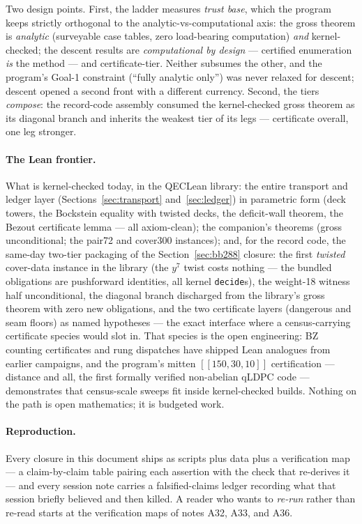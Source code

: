 \documentclass[11pt]{article}
\theoremstyle{plain}
\theoremstyle{definition}
\theoremstyle{remark}
\begin{document}
Two design points. First, the ladder measures \emph{trust base}, which
the program keeps strictly orthogonal to the analytic-vs-computational
axis: the gross theorem is \emph{analytic} (surveyable case tables,
zero load-bearing computation) \emph{and} kernel-checked; the descent
results are \emph{computational by design} --- certified enumeration
\emph{is} the method --- and certificate-tier. Neither subsumes the
other, and the program's Goal-1 constraint (``fully analytic only'') was
never relaxed for descent; descent opened a second front with a
different currency. Second, the tiers \emph{compose}: the record-code
assembly consumed the kernel-checked gross theorem as its diagonal
branch and inherits the weakest tier of its legs --- certificate overall,
one leg stronger.

\paragraph{The Lean frontier.}
What is kernel-checked today, in the QECLean library: the entire
transport and ledger layer (Sections~\ref{sec:transport}
and~\ref{sec:ledger}) in parametric form (deck towers, the Bockstein
equality with twisted decks, the deficit-wall theorem, the Bezout
certificate lemma --- all axiom-clean); the companion's theorems (gross
unconditional; the pair72 and cover300 instances); and, for the record code, the same-day two-tier
packaging of the Section~\ref{sec:bb288} closure: the first
\emph{twisted} cover-data instance in the library (the $y^7$ twist costs
nothing --- the bundled obligations are pushforward identities, all
kernel \texttt{decide}s), the weight-18 witness half unconditional, the
diagonal branch discharged from the library's gross theorem with zero
new obligations, and the two certificate layers (dangerous and seam
floors) as named hypotheses --- the exact interface where a
census-carrying certificate species would slot in. That species is the
open engineering: BZ counting certificates and rung dispatches have
shipped Lean analogues from earlier campaigns, and the program's mitten
$[[150,30,10]]$ certification --- distance and all, the first formally
verified non-abelian qLDPC code --- demonstrates that census-scale
sweeps fit inside kernel-checked builds. Nothing on the path is open
mathematics; it is budgeted work.

\paragraph{Reproduction.}
Every closure in this document ships as scripts plus data plus a
verification map --- a claim-by-claim table pairing each assertion with
the check that re-derives it --- and every session note carries a
falsified-claims ledger recording what that session briefly believed and
then killed. A reader who wants to \emph{re-run} rather than re-read
starts at the verification maps of notes A32, A33, and A36.
\end{document}
